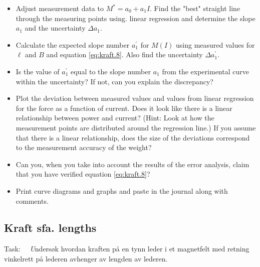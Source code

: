 \documentclass[../Elmag-labhefte-2020.tex]{subfiles}
\begin{document}
\vspace{-4mm}
\begin{itemize}
    \item Adjust measurement data to $M^\ast = a_0 + a_1 I$. Find the "best" straight line through the measuring points using. linear regression and determine the slope $a_1$ and the uncertainty $\Delta a_1$.
    \item Calculate the expected slope number $a_1^\prime$ for $M(I)$ using measured values   for $\ell$ and $B$ and equation \eqref{eq:kraft.8}. Also find the uncertainty $\Delta a_1^\prime$.
    \item Is the value of $a_1^\prime$ equal to the slope number $a_1$ from the experimental curve within the uncertainty? If not, can you explain the discrepancy?
    \item Plot the deviation between measured values   and values   from linear regression for the force as a function of current. Does it look like there is a linear relationship between power and current? (Hint: Look at how the measurement points are distributed around the regression line.) If you assume that there is a linear relationship, does the size of the deviations correspond to the measurement accuracy of the weight? %
    \item Can you, when you take into account the results of the error analysis, claim that you have verified equation \eqref{eq:kraft.8}?
    \item Print curve diagrams and graphs and paste in the journal along with comments.
\end{itemize}

\subsection{Kraft sfa. lengths \label{ch.kraft.lengde}}

Task: \ \
{\emph Undersøk hvordan kraften på en tynn leder i et magnetfelt med retning vinkelrett på lederen avhenger av lengden av lederen.}
\end{document}
